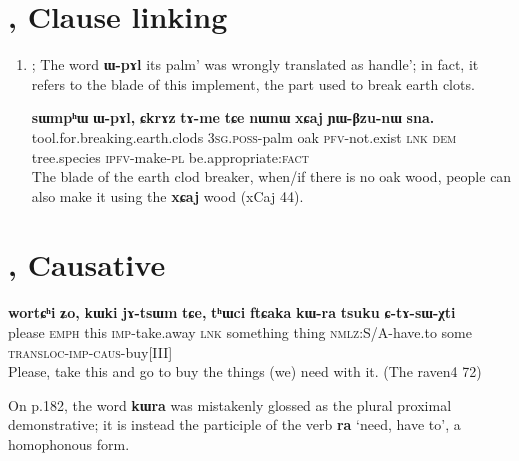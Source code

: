 \documentclass[oldfontcommands,oneside,a4paper,11pt]{article}
\newcommand{\ipa}[1]{{\phon\textbf{\mbox{#1}}}}
\begin{document}
\section{\citet{jacques14linking}, Clause linking}
\begin{enumerate}


\item \citet[284, ex. 33]{jacques14linking}; The word \ipa{ɯ-pɤl}  its palm' was wrongly translated as  handle'; in fact, it refers to the blade of this implement, the part used to break earth clots.


\begin{exe}
\ex \label{ex:CkrAz.tAme}
\gll 
   	\ipa{sɯmpʰɯ}  	\ipa{ɯ-pɤl,}  	\ipa{ɕkrɤz}  	\ipa{tɤ-me}  	\ipa{tɕe}  	\ipa{nɯnɯ}  	\ipa{xɕaj}  	\ipa{ɲɯ-βzu-nɯ}  	\ipa{sna.}  \\
   	tool.for.breaking.earth.clods \textsc{3sg.poss}-palm oak \textsc{pfv}-not.exist \textsc{lnk} \textsc{dem} tree.species \textsc{ipfv}-make-\textsc{pl} be.appropriate:\textsc{fact} \\
\glt The blade of the earth clod breaker, when/if there is no oak wood, people can also make it using the \ipa{xɕaj} wood (xCaj 44).
\end{exe}
\end{enumerate}

\section{\citet{jacques15causative}, Causative}
  \begin{exe}
\ex \label{ex:assoc.motion1}
\gll
\ipa{wortɕʰi} 	\ipa{ʑo,} 	\ipa{kɯki} 	\ipa{jɤ-tsɯm} 	\ipa{tɕe,} 	\ipa{tʰɯci} 	\ipa{ftɕaka} 	\ipa{kɯ-ra} 	\ipa{tsuku} 	\ipa{ɕ-tɤ-sɯ-χti} \\
please \textsc{emph} this \textsc{imp}-take.away \textsc{lnk} something thing \textsc{nmlz}:S/A-have.to some \textsc{transloc-imp-caus}-buy[III] \\
\glt Please, take this and go to buy the things (we) need with it. (The raven4 72)
  \end{exe} 
On p.182, the word \ipa{kɯra} was mistakenly glossed as the plural proximal demonstrative; it is instead the participle of the verb \ipa{ra} `need, have to', a homophonous form.
  
  


\end{document}
